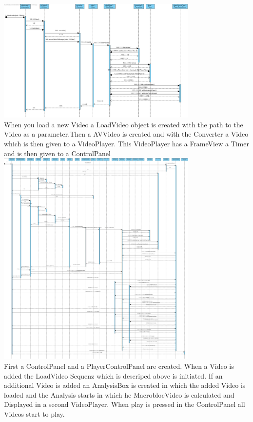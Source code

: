 \documentclass[twoside]{book}
\newcommand{\+}{\discretionary{\mbox{\scriptsize$\hookleftarrow$}}{}{}}
\newcommand{\clearemptydoublepage}{%
  \newpage{\pagestyle{empty}\cleardoublepage}%
}
\begin{document}
\backmatter
\newpage
{}
\clearemptydoublepage
{}
\printindex
\newpage
{\centering\includegraphics[width=10cm]{Sequence Diagram1.jpg}}\\
When you load a new Video a LoadVideo object is created with the path to the Video as a parameter.Then a AVVideo is created and with the Converter a Video which is then given to a VideoPlayer. This VideoPlayer has a FrameView a Timer and is then given to a ControlPanel
\newpage
{\centering\includegraphics[width=10cm]{Sequence Diagram2.jpg}}\\
First a ControlPanel and a PlayerControlPanel are created. When a Video is added the LoadVideo Sequenz which is descriped above is initiated.  If an additional Video is added  
an AnalysisBox is created in which the added Video is loaded and the Analysis starts in which he MacroblocVideo is calculated and Displayed in a second VideoPlayer.
When play is pressed in the ControlPanel all Videos start to play.
\end{document}
